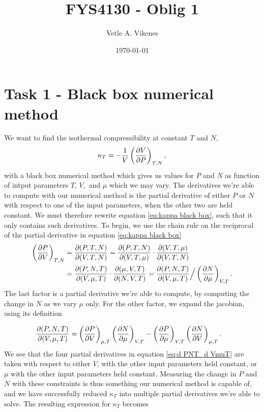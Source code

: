 \documentclass[reprint,english,notitlepage,aps,nobalancelastpage,nofootinbib]{revtex4-1}
\newcommand{\closed}[1]{\left(#1\right)}
\newcommand{\kt}{\kappa_T}
\newcommand{\tmdv}[4]{\closed{\pdv{#1}{#2}}_{#3,#4}}
\newcommand{\jacobian}[2]{\pdv{(#1)}{(#2)}}
\begin{document}
\begin{center}
\title{\Huge FYS4130 - Oblig 1}
\author{\large Vetle A. Vikenes}
\date{\today}
\noaffiliation


\maketitle
\end{center}
\onecolumngrid
\centering
\section*{\large Task 1 - Black box numerical method}
We want to find the isothermal compressibility at constant $T$ and $N$,
\begin{align} \label{eq:kappa black box}
	\kt = -\frac{1}{V}\closed{\pdv{V}{P}}_{T,N},
\end{align}
with a black box numerical method which gives us values for $P$ and $N$ as function of intput parameters $T,\,V,$ and $\mu$ which we may vary. The derivatives we're able to compute with our numerical method is the partial derivative of either $P$ or $N$ with respect to one of the input parameters, when the other two are held constant. We must therefore rewrite equation \eqref{eq:kappa black box}, such that it only contains such derivatives. To begin, we use the chain rule on the reciprocal of the partial derivative in equation \eqref{eq:kappa black box}
\begin{align*}
	\tmdv{P}{V}{T}{N} &= \jacobian{P,T,N}{V,T,N}=\jacobian{P,T,N}{V,T,\mu}\cdot\jacobian{V,T,\mu}{V,T,N} \\
	&= \jacobian{P,N,T}{V,\mu,T}\cdot\jacobian{\mu,V,T}{N,V,T}=
	\jacobian{P,N,T}{V,\mu,T} \Big/ \tmdv{N}{\mu}{V}{T}.
\end{align*}
The last factor is a partial derivative we're able to compute, by computing the change in $N$ as we vary $\mu$ only. For the other factor, we expand the jacobian, using its definition 

\begin{align}
	\jacobian{P,N,T}{V,\mu,T} &= \tmdv{P}{V}{\mu}{T}\tmdv{N}{\mu}{V}{T}-\tmdv{P}{\mu}{V}{T}\tmdv{N}{V}{\mu}{T}. \label{eq:d PNT_d VmuT}
\end{align}
We see that the four partial derivatives in equation \eqref{eq:d PNT_d VmuT} are taken with respect to either $V$, with the other input parameters held constant, or $\mu$ with the other input parameters held constant. Measuring the change in $P$ and $N$ with these constraints is thus something our numerical method is capable of, and we have successfully reduced $\kt$ into multiple partial derivatives we're able to solve. The resulting expression for $\kt$ becomes  
\end{document}
